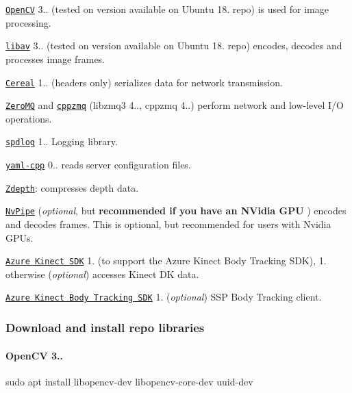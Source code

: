 \begin{DoxyItemize}
\item \href{https://opencv.org/}{\tt Open\+CV} 3.. (tested on version available on Ubuntu 18. repo) is used for image processing.
\item \href{https://github.com/libav/libav/}{\tt libav} 3.. (tested on version available on Ubuntu 18. repo) encodes, decodes and processes image frames.
\item \href{https://uscilab.github.io/cereal/}{\tt Cereal} 1.. (headers only) serializes data for network transmission.
\item \href{http://zeromq.org/}{\tt Zero\+MQ} and \href{https://github.com/zeromq/cppzmq/}{\tt cppzmq} (libzmq3 4.., cppzmq 4..) perform network and low-\/level I/O operations.
\item \href{https://github.com/gabime/spdlog/}{\tt spdlog} 1.. Logging library.
\item \href{https://github.com/jbeder/yaml-cpp/}{\tt yaml-\/cpp} 0.. reads server configuration files.
\item \href{https://github.com/catid/Zdepth.git}{\tt Zdepth}\+: compresses depth data.
\item \href{https://github.com/NVIDIA/NvPipe/}{\tt Nv\+Pipe} ({\itshape optional}, but {\bfseries recommended if you have an N\+Vidia G\+PU} ) encodes and decodes frames. This is optional, but recommended for users with Nvidia G\+P\+Us.
\item \href{https://github.com/microsoft/Azure-Kinect-Sensor-SDK/}{\tt Azure Kinect S\+DK} 1. (to support the Azure Kinect Body Tracking S\+DK), 1. otherwise ({\itshape optional}) accesses Kinect DK data.
\item \href{https://docs.microsoft.com/bs-cyrl-ba/azure/Kinect-dk/body-sdk-download/}{\tt Azure Kinect Body Tracking S\+DK} 1. ({\itshape optional}) S\+SP Body Tracking client.
\end{DoxyItemize}

\subsubsection*{Download and install repo libraries}

\paragraph*{Open\+CV 3..}


\begin{DoxyCode}
sudo apt install libopencv-dev libopencv-core-dev uuid-dev
\end{DoxyCode}

